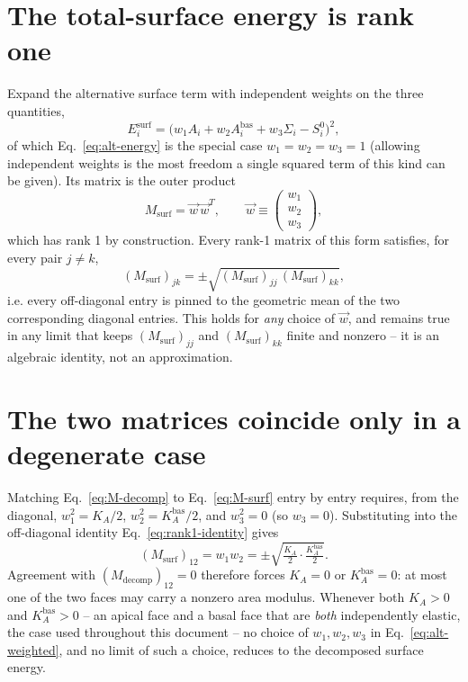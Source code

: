 \documentclass[11pt,a4paper]{report}
\begin{document}
\section*{The total-surface energy is rank one}
Expand the alternative surface term with independent weights on the
three quantities,
\begin{equation}
  E_i^{\mathrm{surf}} = \bigl(w_1 A_i + w_2 A_i^{\mathrm{bas}} + w_3 \Sigma_i - S_i^0\bigr)^2,
  \label{eq:alt-weighted}
\end{equation}
of which Eq.~\eqref{eq:alt-energy} is the special case
$w_1=w_2=w_3=1$ (allowing independent weights is the most freedom a
single squared term of this kind can be given). Its matrix is the
outer product
\begin{equation}
  M_{\mathrm{surf}} = \vec w\,\vec w^{T}, \qquad
  \vec w \equiv \begin{pmatrix} w_1 \\ w_2 \\ w_3 \end{pmatrix},
  \label{eq:M-surf}
\end{equation}
which has rank 1 by construction. Every rank-1 matrix of this form
satisfies, for every pair $j\neq k$,
\begin{equation}
  (M_{\mathrm{surf}})_{jk} = \pm\sqrt{(M_{\mathrm{surf}})_{jj}\,(M_{\mathrm{surf}})_{kk}},
  \label{eq:rank1-identity}
\end{equation}
i.e. every off-diagonal entry is pinned to the geometric mean of the
two corresponding diagonal entries. This holds for \emph{any} choice
of $\vec w$, and remains true in any limit that keeps
$(M_{\mathrm{surf}})_{jj}$ and $(M_{\mathrm{surf}})_{kk}$ finite and
nonzero -- it is an algebraic identity, not an approximation.

\section*{The two matrices coincide only in a degenerate case}
Matching Eq.~\eqref{eq:M-decomp} to Eq.~\eqref{eq:M-surf} entry by
entry requires, from the diagonal, $w_1^2=K_A/2$,
$w_2^2=K_A^{\mathrm{bas}}/2$, and $w_3^2=0$ (so $w_3=0$). Substituting
into the off-diagonal identity Eq.~\eqref{eq:rank1-identity} gives
\begin{equation}
  (M_{\mathrm{surf}})_{12} = w_1w_2 = \pm\sqrt{\tfrac{K_A}{2}\cdot\tfrac{K_A^{\mathrm{bas}}}{2}}.
\end{equation}
Agreement with $(M_{\mathrm{decomp}})_{12}=0$ therefore forces
$K_A=0$ or $K_A^{\mathrm{bas}}=0$: at most one of the two faces may
carry a nonzero area modulus. Whenever both $K_A>0$ and
$K_A^{\mathrm{bas}}>0$ -- an apical face and a basal face that are
\emph{both} independently elastic, the case used throughout this
document -- no choice of $w_1,w_2,w_3$ in Eq.~\eqref{eq:alt-weighted},
and no limit of such a choice, reduces to the decomposed surface
energy.
\end{document}
